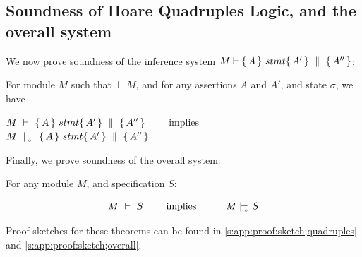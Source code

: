   



\subsection{ Soundness of Hoare Quadruples Logic, and the overall system}
\label{sect:prove:sound:quadruples}
We now prove soundness of the inference system $M \vdash   \{\, A \, \}\ stmt \{\, A' \, \} \, \,\parallel\,\, \{\, A'' \, \} $:


\begin{theorem}
\label{t:quadruple:sound}
For module  $M$ %
such that  $\vdash M$, and for any assertions $A$ and $A'$, and state  $\sigma$, we have

\begin{center}
$M\ \vdash\   \{\, A \, \}\ stmt \{\, A' \, \} \, \,\parallel\,\, \{\, A'' \, \} $ \ \ \ \ implies \ \ \ \ $M\ \modelsD\  \quadruple {A} {stmt} {A'} {A''}$
\end{center}

\end{theorem}

\label{sect:prove:triples:overall}
\noindent
Finally, we  prove soundness of the overall system:

\begin{theorem}[Soundness]
\label{thm:soundness}
 For any module $M$, and specification $S$:
 
 $$\proves{M}{S}\ \ \ \ \ \ \ \mbox{implies}\ \ \ \ \ \  \ \ \ {M} \modelsD {S}$$
\end{theorem}

Proof sketches for these theorems can be found in \A \ref{s:app:proof:sketch;quadruples} and \ref{s:app:proof:sketch;overall}. 

%
